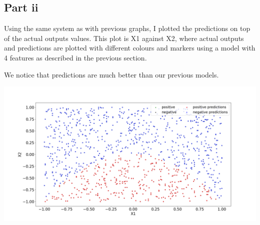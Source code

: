 \documentclass[10pt]{article}
\begin{document}
\subsection*{Part ii}
Using the same system as with previous graphs, I plotted
the predictions on top of the actual outputs values. This
plot is X1 against X2, where actual outputs and predictions are
plotted with different colours and markers using a model with 4 features
as described in the previous section.


We notice that predictions are much better than our previous models.

\includegraphics[scale=0.245]{Figure_3.png}
\end{document}
